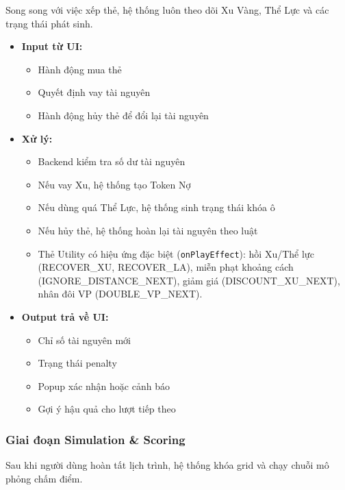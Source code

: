 Song song với việc xếp thẻ, hệ thống luôn theo dõi Xu Vàng, Thể Lực và các trạng thái phát sinh.

\begin{itemize}[topsep=0pt, itemsep=2.5pt, leftmargin=1.5cm]
    \item \textbf{Input từ UI:}
    \begin{itemize}[topsep=0pt, itemsep=2pt]
        \item Hành động mua thẻ
        \item Quyết định vay tài nguyên
        \item Hành động hủy thẻ để đổi lại tài nguyên
    \end{itemize}

    \item \textbf{Xử lý:}
    \begin{itemize}[topsep=0pt, itemsep=2pt]
        \item Backend kiểm tra số dư tài nguyên
        \item Nếu vay Xu, hệ thống tạo Token Nợ
        \item Nếu dùng quá Thể Lực, hệ thống sinh trạng thái khóa ô
        \item Nếu hủy thẻ, hệ thống hoàn lại tài nguyên theo luật
        \item Thẻ Utility có hiệu ứng đặc biệt (\texttt{onPlayEffect}): hồi Xu/Thể lực (RECOVER\_XU, RECOVER\_LA), miễn phạt khoảng cách (IGNORE\_DISTANCE\_NEXT), giảm giá (DISCOUNT\_XU\_NEXT), nhân đôi VP (DOUBLE\_VP\_NEXT).
    \end{itemize}

    \item \textbf{Output trả về UI:}
    \begin{itemize}[topsep=0pt, itemsep=2pt]
        \item Chỉ số tài nguyên mới
        \item Trạng thái penalty
        \item Popup xác nhận hoặc cảnh báo
        \item Gợi ý hậu quả cho lượt tiếp theo
    \end{itemize}
\end{itemize}

\subsubsection{Giai đoạn Simulation \& Scoring}

Sau khi người dùng hoàn tất lịch trình, hệ thống khóa grid và chạy chuỗi mô phỏng chấm điểm.

